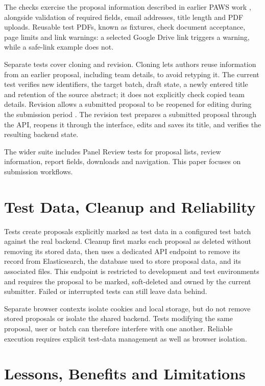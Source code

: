 \documentclass[11pt,twoside]{article}
\begin{document}
The checks exercise the proposal information described in earlier PAWS work \citep{SchwartzBaloyiSithole2024PAWSSubmission}, alongside validation of required fields, email addresses, title length and PDF uploads. Reusable test PDFs, known as fixtures, check document acceptance, page limits and link warnings: a selected Google Drive link triggers a warning, while a safe-link example does not.

Separate tests cover cloning and revision. Cloning lets authors reuse information from an earlier proposal, including team details, to avoid retyping it. The current test verifies new identifiers, the target batch, draft state, a newly entered title and retention of the source abstract; it does not explicitly check copied team details. Revision allows a submitted proposal to be reopened for editing during the submission period \citep{SchwartzBaloyiSithole2024PAWSSubmission}. The revision test prepares a submitted proposal through the API, reopens it through the interface, edits and saves its title, and verifies the resulting backend state.

The wider suite includes Panel Review tests for proposal lists, review information, report fields, downloads and navigation. This paper focuses on submission workflows.


\section{Test Data, Cleanup and Reliability}

Tests create proposals explicitly marked as test data in a configured test batch against the real backend. Cleanup first marks each proposal as deleted without removing its stored data, then uses a dedicated API endpoint to remove its record from Elasticsearch, the database used to store proposal data, and its associated files. This endpoint is restricted to development and test environments and requires the proposal to be marked, soft-deleted and owned by the current submitter. Failed or interrupted tests can still leave data behind.

Separate browser contexts isolate cookies and local storage, but do not remove stored proposals or isolate the shared backend. Tests modifying the same proposal, user or batch can therefore interfere with one another. Reliable execution requires explicit test-data management as well as browser isolation.


\section{Lessons, Benefits and Limitations}
\end{document}
